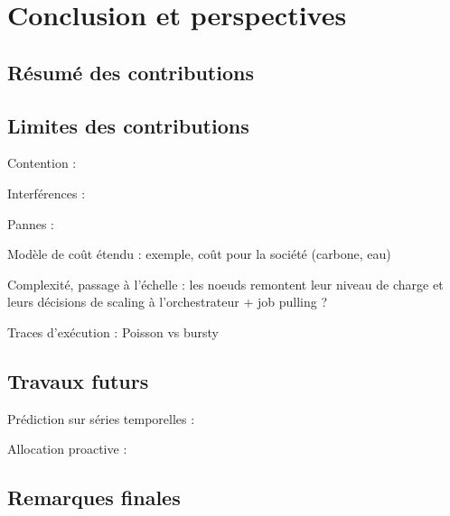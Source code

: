 \chapter{Conclusion et perspectives}
\label{chapter:conclusion}

\section{Résumé des contributions}

\section{Limites des contributions}

Contention : \cite{vanbeekCPUContentionPredictor2019} \cite{jacquetSweetspotVMOversubscribingCPU}

Interférences : \cite{kohAnalysisPerformanceInterference2007} \cite{vardasImprovedParallelApplication}

Pannes : \cite{javadiFailureTraceArchive2013, galletModelSpaceCorrelatedFailures2010}

Modèle de coût étendu : exemple, coût pour la société (carbone, eau) \cite{rickeCountrylevelSocialCost2018}

Complexité, passage à l'échelle : les noeuds remontent leur niveau de charge et leurs décisions de scaling à l'orchestrateur \cite{straesserPowerApplicationsVision2023} + job pulling ?

Traces d'exécution : Poisson vs bursty

\section{Travaux futurs}


Prédiction sur séries temporelles : \cite{bauerTimeSeriesForecasting2020}

Allocation proactive : \cite{parkGraphNeuralNetworkBased2024}

\section{Remarques finales}
